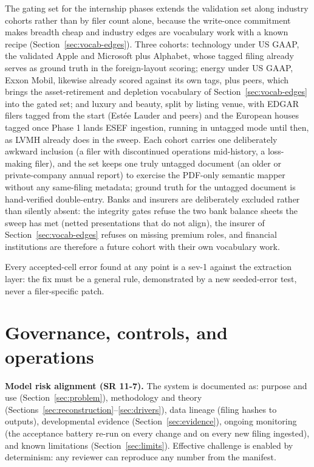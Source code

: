 \documentclass[11pt]{article}
\newcommand{\lead}[2]{\par\addvspace{5pt}\textbf{\textcolor{#1}{#2}}}
\begin{document}
The gating set for the internship phases extends the validation set along industry cohorts rather than by filer count alone, because the write-once commitment makes breadth cheap and industry edges are vocabulary work with a known recipe (Section~\ref{sec:vocab-edges}). Three cohorts: technology under US GAAP, the validated Apple and Microsoft plus Alphabet, whose tagged filing already serves as ground truth in the foreign-layout scoring; energy under US GAAP, Exxon Mobil, likewise already scored against its own tags, plus peers, which brings the asset-retirement and depletion vocabulary of Section~\ref{sec:vocab-edges} into the gated set; and luxury and beauty, split by listing venue, with EDGAR filers tagged from the start (Est\'ee Lauder and peers) and the European houses tagged once Phase 1 lands ESEF ingestion, running in untagged mode until then, as LVMH already does in the sweep. Each cohort carries one deliberately awkward inclusion (a filer with discontinued operations mid-history, a loss-making filer), and the set keeps one truly untagged document (an older or private-company annual report) to exercise the PDF-only semantic mapper without any same-filing metadata; ground truth for the untagged document is hand-verified double-entry. Banks and insurers are deliberately excluded rather than silently absent: the integrity gates refuse the two bank balance sheets the sweep has met (netted presentations that do not align), the insurer of Section~\ref{sec:vocab-edges} refuses on missing premium roles, and financial institutions are therefore a future cohort with their own vocabulary work.

Every accepted-cell error found at any point is a sev-1 against the extraction layer: the fix must be a general rule, demonstrated by a new seeded-error test, never a filer-specific patch.

\section{Governance, controls, and operations}
\label{sec:governance}
\lead{navytwo}{Model risk alignment (SR 11-7).} The system is documented as: purpose and use (Section~\ref{sec:problem}), methodology and theory (Sections~\ref{sec:reconstruction}--\ref{sec:drivers}), data lineage (filing hashes to outputs), developmental evidence (Section~\ref{sec:evidence}), ongoing monitoring (the acceptance battery re-run on every change and on every new filing ingested), and known limitations (Section~\ref{sec:limits}). Effective challenge is enabled by determinism: any reviewer can reproduce any number from the manifest.
\end{document}
